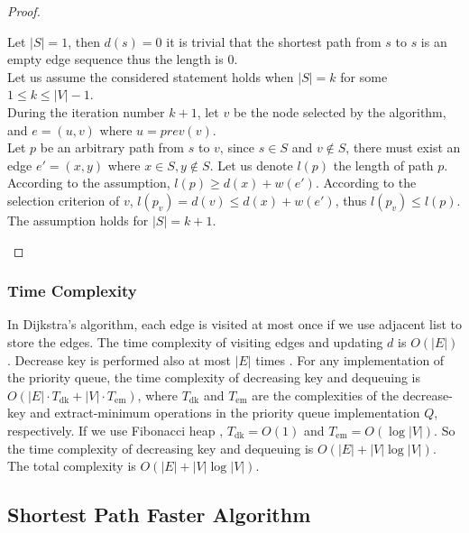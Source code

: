 \documentclass[a4paper, margin=15in]{article}
\newenvironment{myenv}{\begin{adjustwidth}{20pt}{}}{\end{adjustwidth}}
\begin{document}
\begin{proof}\cite{cormen2009introduction}
\begin{myenv}
\noindent Let $\vert S \vert = 1$, then $d(s) = 0$ it is trivial that the shortest path from $s$ to $s$ is an empty edge sequence thus the length is $0$. \\
Let us assume the considered statement holds when $ \vert S \vert = k $ for some $ 1 \leq k \leq \vert V \vert -1$. \\
During the iteration number $k+1$, let $v$ be the node selected by the algorithm, and $e = (u,v)$ where $u = prev(v)$. \\
Let $p$ be an arbitrary path from $s$ to $v$, since $s \in S$ and $v \notin S$, there must exist an edge $e' = (x,y)$ where $x \in S, y \notin S$. Let us denote $l(p)$ the length of path $p$. According to the assumption, $l(p) \geq d(x) + w(e')$. According to the selection criterion of $v$, $l(p_v) = d(v) \leq d(x) + w(e')$, thus $l(p_v) \leq l(p)$. The assumption holds for $ \vert S \vert = k+1$.
\end{myenv}
\end{proof}

\subsubsection{Time Complexity}
In Dijkstra's algorithm, each edge is visited at most once if we use adjacent list to store the edges. The time complexity of visiting edges and updating $d$ is $O(|E|)$. Decrease key is performed also at most $|E|$ times \cite{cormen2009introduction}.
For any implementation of the priority queue, the time complexity of decreasing key and dequeuing is $O(|E|\cdot T_{\mathrm {dk} }+|V|\cdot T_{\mathrm {em} })$, where $ T_{\mathrm {dk} }$ and  $T_{\mathrm {em} }$ are the complexities of the decrease-key and extract-minimum operations in the priority queue implementation $Q$, respectively. If we use Fibonacci heap \cite{fredman1987fibonacci}, $T_{\mathrm {dk} } = O(1)$ and $T_{\mathrm {em} } = O(\log|V|) $. So the time complexity of decreasing key and dequeuing is $O(|E|+|V|\log |V|)$. The total complexity is $O(|E|+|V|\log |V|)$\cite{cormen2009introduction}.

\subsection{Shortest Path Faster Algorithm}
\end{document}
